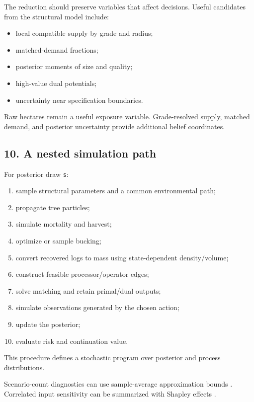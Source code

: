 The reduction should preserve variables that affect decisions. Useful candidates
from the structural model include:

\begin{itemize}
\tightlist
\item
  local compatible supply by grade and radius;
\item
  matched-demand fractions;
\item
  posterior moments of size and quality;
\item
  high-value dual potentials;
\item
  uncertainty near specification boundaries.
\end{itemize}

Raw hectares remain a useful exposure variable. Grade-resolved supply, matched
demand, and posterior uncertainty provide additional belief coordinates.

\subsection{10. A nested simulation path}\label{a-nested-simulation-path}

For posterior draw \texttt{s}:

\begin{enumerate}
\def\labelenumi{\arabic{enumi}.}
\tightlist
\item
  sample structural parameters and a common environmental path;
\item
  propagate tree particles;
\item
  simulate mortality and harvest;
\item
  optimize or sample bucking;
\item
  convert recovered logs to mass using state-dependent density/volume;
\item
  construct feasible processor/operator edges;
\item
  solve matching and retain primal/dual outputs;
\item
  simulate observations generated by the chosen action;
\item
  update the posterior;
\item
  evaluate risk and continuation value.
\end{enumerate}

This procedure defines a stochastic program over posterior and process
distributions.

Scenario-count diagnostics can use sample-average approximation bounds
\citep{kleywegt2002saa}. Correlated input sensitivity can be summarized with
Shapley effects \citep{iooss2019shapley}.

